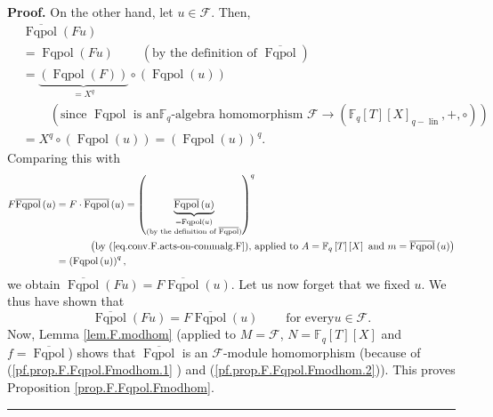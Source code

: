 \documentclass[numbers=enddot,12pt,final,onecolumn,notitlepage]{scrartcl}%
\theoremstyle{definition}
\newenvironment{proof}[1][Proof]{\noindent\textbf{#1.} }{\ \rule{0.5em}{0.5em}}
\begin{document}
\begin{proof}
On the other hand, let $u\in\mathcal{F}$. Then,%
\begin{align*}
&  \overline{\operatorname*{Fqpol}}\left(  Fu\right) \\
&  =\operatorname*{Fqpol}\left(  Fu\right)  \ \ \ \ \ \ \ \ \ \ \left(
\text{by the definition of }\overline{\operatorname*{Fqpol}}\right) \\
&  =\underbrace{\left(  \operatorname*{Fqpol}\left(  F\right)  \right)
}_{=X^{q}}\circ\left(  \operatorname*{Fqpol}\left(  u\right)  \right) \\
&  \ \ \ \ \ \ \ \ \ \ \left(  \text{since }\operatorname*{Fqpol}\text{ is an
}\mathbb{F}_{q}\text{-algebra homomorphism }\mathcal{F}\rightarrow\left(
\mathbb{F}_{q}\left[  T\right]  \left[  X\right]  _{q-\operatorname*{lin}%
},+,\circ\right)  \right) \\
&  =X^{q}\circ\left(  \operatorname*{Fqpol}\left(  u\right)  \right)  =\left(
\operatorname*{Fqpol}\left(  u\right)  \right)  ^{q}.
\end{align*}
Comparing this with%
\begin{align*}
F\overline{\operatorname*{Fqpol}}\left(  u\right)   &  =F\cdot\overline
{\operatorname*{Fqpol}}\left(  u\right)  =\left(  \underbrace{\overline
{\operatorname*{Fqpol}}\left(  u\right)  }_{\substack{=\operatorname*{Fqpol}%
\left(  u\right)  \\\text{(by the definition of }\overline
{\operatorname*{Fqpol}}\text{)}}}\right)  ^{q}\\
&  \ \ \ \ \ \ \ \ \ \ \left(  \text{by (\ref{eq.conv.F.acts-on-commalg.F}),
applied to }A=\mathbb{F}_{q}\left[  T\right]  \left[  X\right]  \text{ and
}m=\overline{\operatorname*{Fqpol}}\left(  u\right)  \right) \\
&  =\left(  \operatorname*{Fqpol}\left(  u\right)  \right)  ^{q},
\end{align*}
we obtain $\overline{\operatorname*{Fqpol}}\left(  Fu\right)  =F\overline
{\operatorname*{Fqpol}}\left(  u\right)  $. Let us now forget that we fixed
$u$. We thus have shown that
\begin{equation}
\overline{\operatorname*{Fqpol}}\left(  Fu\right)  =F\overline
{\operatorname*{Fqpol}}\left(  u\right)  \ \ \ \ \ \ \ \ \ \ \text{for every
}u\in\mathcal{F}. \label{pf.prop.F.Fqpol.Fmodhom.2}%
\end{equation}
Now, Lemma \ref{lem.F.modhom} (applied to $M=\mathcal{F}$, $N=\mathbb{F}%
_{q}\left[  T\right]  \left[  X\right]  $ and $f=\overline
{\operatorname*{Fqpol}}$) shows that $\overline{\operatorname*{Fqpol}}$ is an
$\mathcal{F}$-module homomorphism (because of (\ref{pf.prop.F.Fqpol.Fmodhom.1}%
) and (\ref{pf.prop.F.Fqpol.Fmodhom.2})). This proves Proposition
\ref{prop.F.Fqpol.Fmodhom}.
\end{proof}
\end{document}
